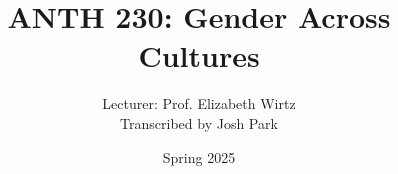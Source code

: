 \documentclass[a4paper]{article}
\title{ANTH 230: Gender Across Cultures}
\author{Lecturer: Prof. Elizabeth Wirtz \\ Transcribed by Josh Park}
\date{Spring 2025}
\begin{document}
\maketitle
\tableofcontents
\pagebreak










\end{document}
